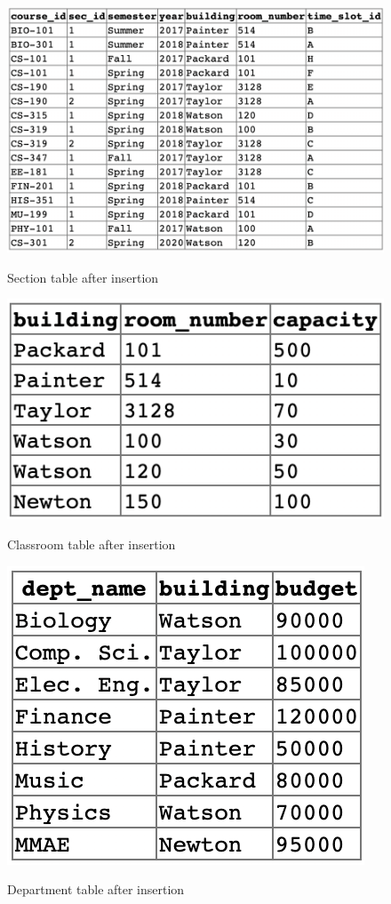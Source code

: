 \documentclass[12pt]{article}
\begin{document}
\begin{figure}[!hbt]
    \centering
    \includegraphics[scale=0.95]{screenshots/section.png}
    \label{fig:my_label1}
    \caption{Section table after insertion}
\end{figure}
\newpage

\begin{figure}[!hbt]
    \centering
    \includegraphics[scale=1.7]{screenshots/classroom.png}
    \label{fig:my_label1}
    \caption{Classroom table after insertion}
\end{figure}

\begin{figure}[!hbt]
    \centering
    \includegraphics[scale=1.7]{screenshots/department.png}
    \label{fig:my_label1}
    \caption{Department table after insertion}
\end{figure}
\newpage
\end{document}
